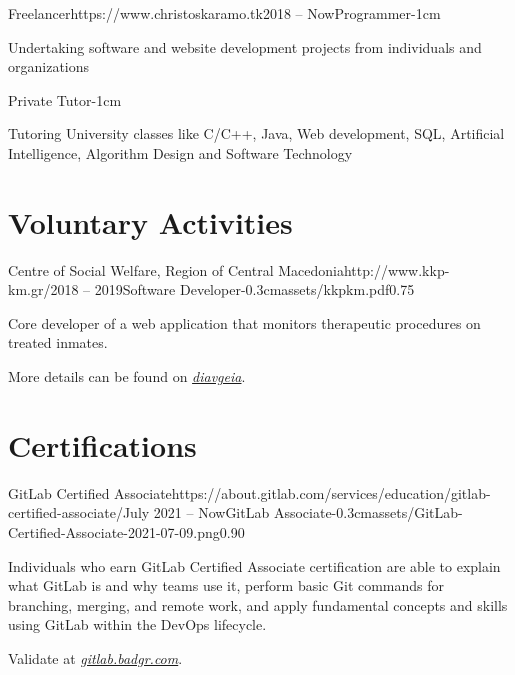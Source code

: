 \documentclass{mycv}
\begin{document}
	\begin{EntryDated}{Freelancer}{https://www.christoskaramo.tk}{2018 -- Now}{Programmer}{-1cm}
	\begin{Itemize}
		\item Undertaking software and website development projects from individuals and organizations
	\end{Itemize}
	\end{EntryDated}

	\vspace*{-1.2cm}

	\begin{EntryDated}{}{}{}{Private Tutor}{-1cm}
		\begin{Itemize}
			\item Tutoring University classes like C/C++, Java, Web development, SQL, Artificial Intelligence, Algorithm Design and Software Technology
		\end{Itemize}
	\end{EntryDated}
	
	\section{Voluntary Activities}
	\begin{EntryDatedLogo}{Centre of Social Welfare, Region of Central Macedonia}{http://www.kkp-km.gr/}{2018 -- 2019}{Software Developer}{-0.3cm}{assets/kkpkm.pdf}{0.75}
		\begin{Itemize}
			\item Core developer of a web application that monitors therapeutic procedures on treated inmates.
			\item More details can be found on \href{https://diavgeia.gov.gr/decision/view/\%CE\%A8\%CE\%A6\%CE\%A1\%CE\%93\%CE\%9F\%CE\%9E\%CE\%A7\%CE\%A3-\%CE\%A0\%CE\%93\%CE\%A6}{\textit{diavgeia}}.
		\end{Itemize}
	\end{EntryDatedLogo}

	\section{Certifications}
    \begin{EntryDatedLogo}{GitLab Certified Associate}{https://about.gitlab.com/services/education/gitlab-certified-associate/}{July 2021 -- Now}{GitLab Associate}{-0.3cm}{assets/GitLab-Certified-Associate-2021-07-09.png}{0.90}
		\begin{Itemize}
			\item Individuals who earn GitLab Certified Associate certification are able to explain what GitLab is and why teams use it, perform basic Git commands for branching, merging, and remote work, and apply fundamental concepts and skills using GitLab within the DevOps lifecycle. 
			\item Validate at \href{https://gitlab.badgr.com/public/assertions/Hw6j8Th9SyKNj8ehsQkqAw}{\textit{gitlab.badgr.com}}.
		\end{Itemize}
	\end{EntryDatedLogo}
	
\end{document}
